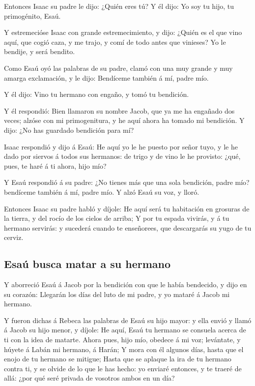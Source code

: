  Entonces Isaac su padre le dijo: ¿Quién eres tú? Y él
dijo: Yo soy tu hijo, tu primogénito, Esaú.

 Y estremecióse Isaac con grande estremecimiento, y dijo:
¿Quién es el que vino aquí, que cogió caza, y me trajo, y comí de todo
antes que vinieses? Yo le bendije, y será bendito.

 Como Esaú oyó las palabras de su padre, clamó con una
muy grande y muy amarga exclamación, y le dijo: Bendíceme también á mí,
padre mío.

 Y él dijo: Vino tu hermano con engaño, y tomó tu
bendición.

 Y él respondió: Bien llamaron su nombre Jacob, que ya me
ha engañado dos veces; alzóse con mi primogenitura, y he aquí ahora ha
tomado mi bendición. Y dijo: ¿No has guardado bendición para mí?

 Isaac respondió y dijo á Esaú: He aquí yo le he puesto
por señor tuyo, y le he dado por siervos á todos sus hermanos: de trigo
y de vino le he provisto: ¿qué, pues, te haré á ti ahora, hijo mío?

 Y Esaú respondió á su padre: ¿No tienes más que una sola
bendición, padre mío? bendíceme también á mí, padre mío. Y alzó Esaú su
voz, y lloró.

 Entonces Isaac su padre habló y díjole: He aquí será tu
habitación en grosuras de la tierra, y del rocío de los cielos de
arriba;  Y por tu espada vivirás, y á tu hermano
servirás: y sucederá cuando te enseñorees, que descargarás su yugo de tu
cerviz.

\hypertarget{esauxfa-busca-matar-a-su-hermano}{%
\subsection{Esaú busca matar a su
hermano}\label{esauxfa-busca-matar-a-su-hermano}}

 Y aborreció Esaú á Jacob por la bendición con que le
había bendecido, y dijo en su corazón: Llegarán los días del luto de mi
padre, y yo mataré á Jacob mi hermano.

 Y fueron dichas á Rebeca las palabras de Esaú su hijo
mayor: y ella envió y llamó á Jacob su hijo menor, y díjole: He aquí,
Esaú tu hermano se consuela acerca de ti con la idea de matarte.
 Ahora pues, hijo mío, obedece á mi voz; levántate, y
húyete á Labán mi hermano, á Harán;  Y mora con él
algunos días, hasta que el enojo de tu hermano se mitigue;
 Hasta que se aplaque la ira de tu hermano contra ti, y
se olvide de lo que le has hecho: yo enviaré entonces, y te traeré de
allá: ¿por qué seré privada de vosotros ambos en un día?

